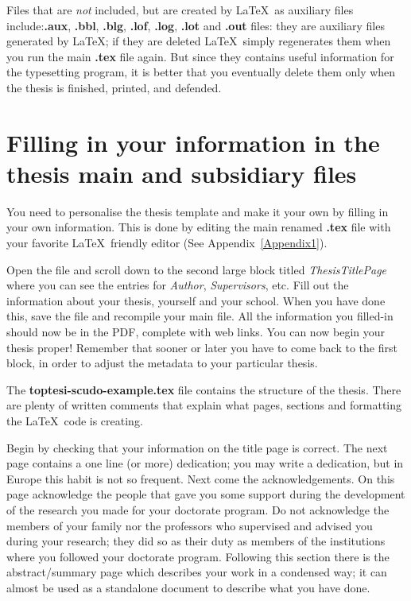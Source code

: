 Files that are \emph{not} included, but are created by \LaTeX\ as auxiliary files include:\textbf{.aux}, \textbf{.bbl}, \textbf{.blg}, \textbf{.lof}, \textbf{.log}, \textbf{.lot} and \textbf{.out} files: they are auxiliary files generated by \LaTeX; if they are deleted \LaTeX\ simply regenerates them when you run the main \textbf{.tex} file again. But since they contains useful information for the typesetting program, it is better that you eventually delete them only when the thesis is finished, printed, and defended. 


\section{Filling in your information in the thesis main and subsidiary files}
\label{section 1.4}

You need to personalise the thesis template and make it your own by filling in your own information. This is done by editing the main renamed \textbf{.tex} file with your favorite \LaTeX\ friendly editor (See Appendix~\ref{Appendix1}).

Open the file and scroll down to the second large block titled \emph{ThesisTitlePage} where you can see the entries for \emph{Author}, \emph{Supervisors}, etc. Fill out the information about your thesis, yourself and your school. When you have done this, save the file and recompile your main file. All the information you filled-in should now be in the PDF, complete with web links. You can now begin your thesis proper!
Remember that sooner or later you have to come back to the first block, in order to adjust the metadata to your particular thesis.

The \textbf{toptesi-scudo-example.tex} file contains the structure of the thesis. There are plenty of written comments that explain what pages, sections and formatting the \LaTeX\ code is creating. 

Begin by checking that your information on the title page is correct. The next page contains a one line (or more) dedication; you may write a dedication, but in Europe this habit is not so frequent. Next come the acknowledgements. On this page acknowledge the people that gave you some support during the development of the research you made for your doctorate program. Do not acknowledge the members of your family nor the professors who supervised and advised you during your research; they did so as their duty as members of the institutions where you followed your doctorate program. Following this section  there is the abstract/summary page which describes  your work in a condensed way; it can almost be used as a standalone document to describe what you have done. 

